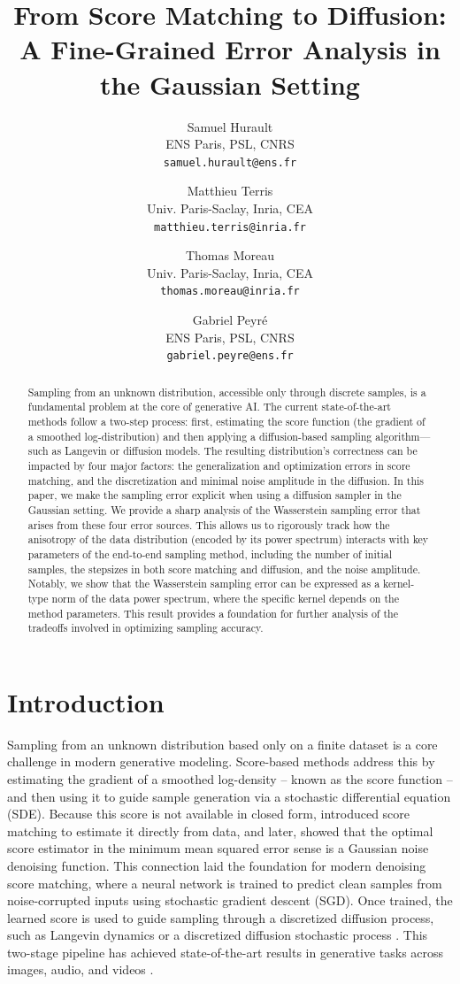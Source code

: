 \documentclass[11pt]{article}
\title{From Score Matching to Diffusion: \\ A Fine-Grained Error Analysis in the Gaussian Setting}
\author{
  Samuel Hurault \\
  ENS Paris, PSL, CNRS \\
   \texttt{samuel.hurault@ens.fr} \\
\and
  Matthieu Terris \\
  Univ. Paris-Saclay, Inria, CEA \\
  \texttt{matthieu.terris@inria.fr} \\
\and
  Thomas Moreau \\
  Univ. Paris-Saclay, Inria, CEA \\
  \texttt{thomas.moreau@inria.fr} \\
\and
  Gabriel Peyré \\
  ENS Paris, PSL, CNRS \\
   \texttt{gabriel.peyre@ens.fr} \\
}
\date{}
\begin{document}
\maketitle


\begin{abstract}
Sampling from an unknown distribution, accessible only through discrete samples, is a fundamental problem at the core of generative AI. The current state-of-the-art methods follow a two-step process: first, estimating the score function (the gradient of a smoothed log-distribution) and then applying a diffusion-based sampling algorithm---such as Langevin or diffusion models. The resulting distribution's correctness can be impacted by four major factors: the generalization and optimization errors in score matching, and the discretization and minimal noise amplitude in the diffusion. In this paper, we make the sampling error explicit when using a diffusion sampler in the Gaussian setting. We provide a sharp analysis of the Wasserstein sampling error that arises from these four error sources. This allows us to rigorously track how the anisotropy of the data distribution (encoded by its power spectrum) interacts with key parameters of the end-to-end sampling method, including the number of initial samples, the stepsizes in both score matching and diffusion, and the noise amplitude. Notably, we show that the Wasserstein sampling error can be expressed as a kernel-type norm of the data power spectrum, where the specific kernel depends on the method parameters. This result provides a foundation for further analysis of the tradeoffs involved in optimizing sampling accuracy.%
\end{abstract}

\section{Introduction}

Sampling from an unknown distribution based only on a finite dataset is a core challenge in modern generative modeling. Score-based methods address this by estimating the gradient of a smoothed log-density -- known as the score function -- and then using it to guide sample generation via a stochastic differential equation (SDE). Because this score is not available in closed form, \cite{hyvarinen2005estimation} introduced score matching to estimate it directly from data, and later, \cite{vincent2011connection} showed that the optimal score estimator in the minimum mean squared error sense is a Gaussian noise denoising function. This connection laid the foundation for modern denoising score matching, where a neural network is trained to predict clean samples from noise-corrupted inputs using stochastic gradient descent (SGD).
Once trained, the learned score is used to guide sampling through a discretized diffusion process, such as Langevin dynamics or a discretized diffusion stochastic process \cite{song2019generative, song2020score}. This two-stage pipeline has achieved state-of-the-art results in generative tasks across images, audio, and videos \cite{ho2020denoising, ho2022video, dhariwal2021diffusion, karras2024analyzing}.
\end{document}
